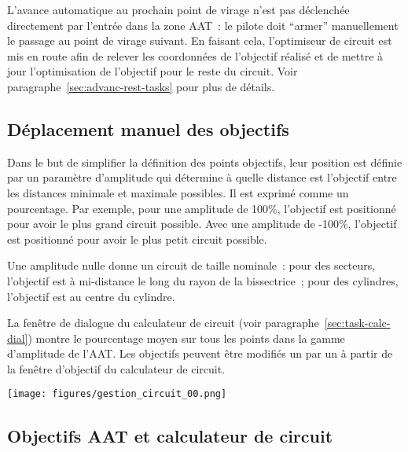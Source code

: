 L'avance automatique au prochain point de virage n'est pas déclenchée directement
par l'entrée dans la zone AAT~: le pilote doit ``armer'' manuellement le passage au point de virage
suivant. En faisant cela, l'optimiseur de circuit est mis en route afin de relever
les coordonnées de l'objectif réalisé et de mettre à jour l'optimisation
de l'objectif pour le reste du circuit. Voir paragraphe~\ref{sec:advanc-rest-tasks} pour plus de détails.

\subsection*{Déplacement manuel des objectifs}

Dans le but de simplifier la définition des points objectifs, 
leur position est définie par un paramètre d'amplitude qui détermine à quelle
distance est l'objectif entre les distances minimale et maximale possibles.  
Il est exprimé comme un pourcentage. Par exemple, pour une amplitude de 100\%,
l'objectif est positionné pour avoir le plus grand circuit possible. Avec une amplitude de -100\%, l'objectif est positionné pour avoir le plus petit circuit possible. 

Une amplitude nulle donne un circuit de taille nominale~:
pour des secteurs, l'objectif est
à mi-distance le long du rayon de la bissectrice~; pour des cylindres, l'objectif est au
centre du cylindre.

La fenêtre de dialogue du calculateur de circuit (voir paragraphe~\ref{sec:task-calc-dial}) montre
le pourcentage moyen sur tous les points dans la gamme d'amplitude de l'AAT.\@
Les objectifs peuvent être modifiés un par un à partir de la fenêtre d'objectif du calculateur de circuit.

\texttt{[image: figures/gestion\_circuit\_00.png]}



\subsection*{Objectifs AAT et calculateur de circuit}

